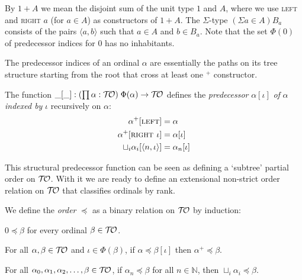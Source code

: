 By $1 + A$ we mean the disjoint sum of the unit type $1$ and $A$,
where we use \textsc{left} and \textsc{right $a$} (for $a \in A$) as
constructors of $1 + A$.
The $\Sigma$-type $(\Sigma a \in A) B_a$ consists of the pairs
$\langle a, b \rangle$ such that $a \in A$ and $b \in B_a$.
Note that the set $\Phi(0)$ of predecessor indices for $0$ has no
inhabitants.

The predecessor indices of an ordinal $\alpha$ are essentially the
paths on its tree structure starting from the root that cross at least
one $^+$ constructor.

\begin{definition}%
The function $\_[\_] : (\prod \alpha : \mathcal{T\!O}) \; \Phi(\alpha)
\rightarrow \mathcal{T\!O}$ defines the \emph{predecessor} $\alpha[\iota]$
\emph{of} $\alpha$ \emph{indexed by} $\iota$ recursively on $\alpha$:
\begin{align*}
  \alpha^+[\textsc{left}]                     &= \alpha \\
  \alpha^+[\textsc{right $\iota$}]            &= \alpha[\iota] \\
  \sqcup_i \alpha_i[\langle n, \iota \rangle] &= \alpha_n[\iota]
\end{align*}
\end{definition}

This structural predecessor function can be seen as defining a `subtree'
partial order on $\mathcal{T\!O}$. With it we are ready to define an extensional
non-strict order relation on $\mathcal{T\!O}$ that classifies ordinals by rank.

\begin{definition}\label{def:order}%
We define the \emph{order} $\preceq$ as a binary relation on $\mathcal{T\!O}$ by
induction:
\pagebreak[3]
\begin{compactenum}
  \item
    $0 \preceq \beta$ for every ordinal $\beta \in \mathcal{T\!O}$.
  \item\label{def:order:succ}
    For all $\alpha, \beta \in \mathcal{T\!O}$ and $\iota \in \Phi(\beta)$, if
    $\alpha \preceq \beta[\iota]$ then $\alpha^+ \preceq \beta$.
  \item
    For all $\alpha_0, \alpha_1, \alpha_2, \ldots, \beta \in \mathcal{T\!O}$, if
    $\alpha_n \preceq \beta$ for all $n \in \mathbb{N}$, then $\sqcup_i
    \alpha_i \preceq \beta$.
\end{compactenum}
\end{definition}

